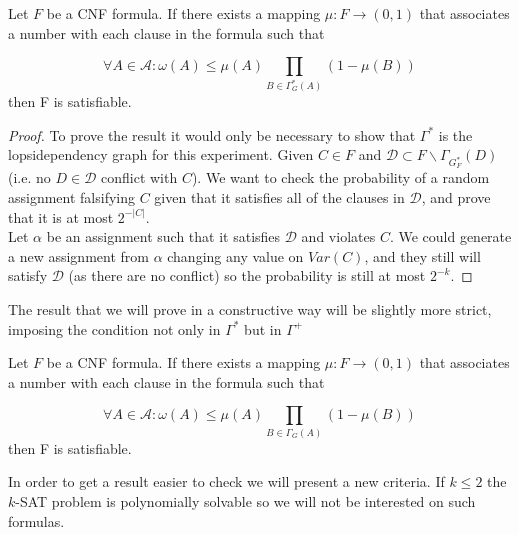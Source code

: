 \begin{corollary}\label{LLLS}
	Let $F$ be a CNF formula. If there exists a mapping $\mu:F\to (0,1)$ that associates a number with each clause in the formula such that 
	
	$$
\forall A \in \mathcal{A} : \omega (A) \le \mu(A) \prod_{B\in\Gamma^*_G(A)} (1-\mu(B))
$$
	then F is satisfiable.
\end{corollary}
\begin{proof}
	To prove the result it would only be necessary to show  that $ \Gamma^*$ is the lopsidependency graph for this experiment. Given $C \in F$ and $\mathcal{D}\subset F\backslash \Gamma_{G_F^*}(D)\ $(i.e. no $D \in  \mathcal{D}$ conflict with $C$). We want to check the probability of a random assignment falsifying $C$ given that it satisfies all of the clauses in $\mathcal{D}$, and prove that it is at most $2^{-|C|}$. \\ 
	
Let $\alpha$ be an assignment such that it satisfies $\mathcal{D}$ and violates $C$. We could generate a new assignment from $\alpha$ changing any value on $Var(C)$, and they still will satisfy $\mathcal{D}$ (as there are no conflict) so the probability is still at most $2^{-k}$. 


\end{proof}


The result that we will prove in a constructive way will be slightly more strict, imposing the condition not only in $\Gamma^*$ but in $\Gamma^+$ 


\begin{corollary}\label{LLLSC}
	Let $F$ be a CNF formula. If there exists a mapping $\mu:F\to (0,1)$ that associates a number with each clause in the formula such that 
	
	$$
\forall A \in \mathcal{A} : \omega (A) \le \mu(A) \prod_{B\in\Gamma_G(A)} (1-\mu(B))
$$
	then F is satisfiable.
\end{corollary}


In order to get a result easier to check we will present a new criteria. If $k\le 2$ the $k$-SAT problem is  polynomially solvable so we will not be interested on such formulas.

